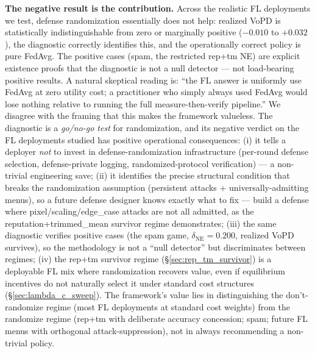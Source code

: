 \documentclass{article}
\begin{document}
\textbf{The negative result is the contribution.} Across the realistic FL deployments we test, defense randomization essentially does not help: realized VoPD is statistically indistinguishable from zero or marginally positive ($-0.010$ to $+0.032$), the diagnostic correctly identifies this, and the operationally correct policy is pure FedAvg. The positive cases (spam, the restricted rep+tm NE) are explicit existence proofs that the diagnostic is not a null detector --- not load-bearing positive results. A natural skeptical reading is: ``the FL answer is uniformly use FedAvg at zero utility cost; a practitioner who simply always used FedAvg would lose nothing relative to running the full measure-then-verify pipeline.'' We disagree with the framing that this makes the framework valueless. The diagnostic is a \emph{go/no-go test} for randomization, and its negative verdict on the FL deployments studied has positive operational consequences: (i) it tells a deployer \emph{not} to invest in defense-randomization infrastructure (per-round defense selection, defense-private logging, randomized-protocol verification) --- a non-trivial engineering save; (ii) it identifies the precise structural condition that breaks the randomization assumption (persistent attacks + universally-admitting menus), so a future defense designer knows exactly what to fix --- build a defense where pixel/scaling/edge\_case attacks are not all admitted, as the reputation+trimmed\_mean survivor regime demonstrates; (iii) the same diagnostic verifies positive cases (the spam game, $\delta_{\text{NE}} = 0.200$, realized VoPD survives), so the methodology is not a ``null detector'' but discriminates between regimes; (iv) the rep+tm survivor regime (§\ref{sec:rep_tm_survivor}) is a deployable FL mix where randomization recovers value, even if equilibrium incentives do not naturally select it under standard cost structures (§\ref{sec:lambda_c_sweep}). The framework's value lies in distinguishing the don't-randomize regime (most FL deployments at standard cost weights) from the randomize regime (rep+tm with deliberate accuracy concession; spam; future FL menus with orthogonal attack-suppression), not in always recommending a non-trivial policy.
\end{document}
